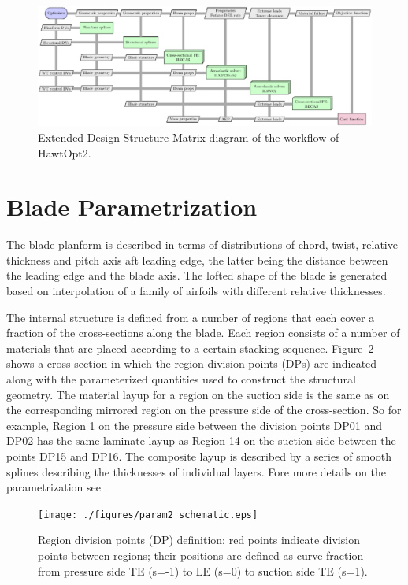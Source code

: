 \begin{figure}[!ht]
\begin{center}
	\includegraphics[width=1\linewidth]{figures/hawtopt2_xdsm.eps}
\end{center}
\caption{Extended Design Structure Matrix diagram of the workflow of HawtOpt2.}
\label{fig:xdsm}
\end{figure}


\section{Blade Parametrization}
\label{sec:blade_params}

The blade planform is described in terms of distributions of chord, twist, relative thickness and pitch axis aft leading edge, the latter being the distance between the leading edge and the blade axis.
The lofted shape of the blade is generated based on interpolation of a family of airfoils with different relative thicknesses.

The internal structure is defined from a number of regions that each cover a fraction of the cross-sections along the blade.
Each region consists of a number of materials that are placed according to a certain stacking sequence.
Figure~\ref{fig:cross_section_def} shows a cross section in which the region division points (DPs) are indicated along with the parameterized quantities used to construct the structural geometry. The material layup for a region on the suction side is the same as on the corresponding mirrored region on the pressure side of the cross-section. So for example, Region 1 on the pressure side between the division points DP01 and DP02 has the same laminate layup as Region 14 on the suction side between the points DP15 and DP16. 
The composite layup is described by a series of smooth splines describing the thicknesses of individual layers. 
Fore more details on the parametrization see \cite{fusedwind}.

\begin{figure}[!ht]
\begin{center}
        \texttt{[image: ./figures/param2\_schematic.eps]}
\end{center}
\caption{Region division points (DP) definition: red points indicate division points between regions; their positions are defined as curve fraction from pressure side TE (s=-1) to LE (s=0) to suction side TE (s=1).}
\label{fig:cross_section_def}
\end{figure}

